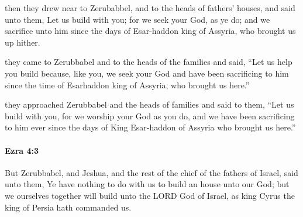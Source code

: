 			\begin{versebox}
					\item[BHS] 
					\item[LXX] 
					\item[ASV] then they drew near to Zerubabbel, and to the heads of fathers' houses, and said unto them, Let us build with you; for we seek your God, as ye do; and we sacrifice unto him since the days of Esar-haddon king of Assyria, who brought us up hither.
					\item[NIV] they came to Zerubbabel and to the heads of the families and said, “Let us help you build because, like you, we seek your God and have been sacrificing to him since the time of Esarhaddon king of Assyria, who brought us here.”
					\item[NRSV] they approached Zerubbabel and the heads of families and said to them, “Let us build with you, for we worship your God as you do, and we have been sacrificing to him ever since the days of King Esar-haddon of Assyria who brought us here.”
			\end{versebox}

		\paragraph{Ezra 4:3} %
			\label{EZRA-4-3}

			But Zerubbabel, and Jeshua, and the rest of the chief of the fathers of Israel, said unto them, Ye have nothing to do with us to build an house unto our God; but we ourselves together will build unto the LORD God of Israel, as king Cyrus the king of Persia hath commanded us.

